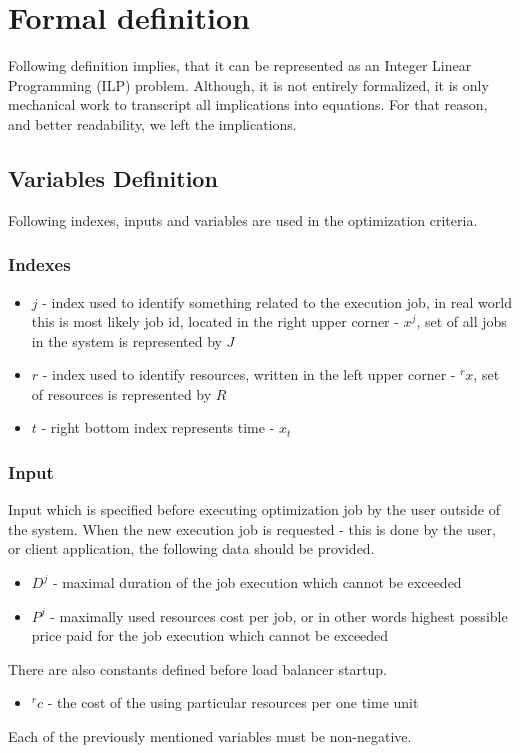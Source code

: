 \section{Formal definition}\label{sec:formal-definition}
Following definition implies, that it can be represented as an Integer Linear Programming (ILP) problem.
Although, it is not entirely formalized, 
it is only mechanical work to transcript all implications into equations.
For that reason, and better readability, we left the implications.

\subsection{Variables Definition}\label{subsec:variables-definition}
Following indexes, inputs and variables are used in the optimization criteria.

\subsubsection{Indexes}
\begin{itemize}
    \item $j$ - index used to identify something related to the execution job,
          in real world this is most likely job id, located in the right upper corner - $x^{j}$, 
          set of all jobs in the system is represented by $J$
    \item $r$ - index used to identify resources, written in the left upper corner - ${}^{r}x$, set of resources is represented by $R$
    \item $t$ - right bottom index represents time - $x_t$
\end{itemize}

\subsubsection{Input}\label{subsubsec:formal-input}
Input which is specified before executing optimization job by the user outside of the system.
When the new execution job is requested - this is done by the user, or client application,
the following data should be provided.
\begin{itemize}
    \item $D^{j}$ - maximal duration of the job execution which cannot be exceeded
    \item $P^{j}$ - maximally used resources cost per job, or in other words highest possible price paid for the job execution which cannot be exceeded
\end{itemize} 
There are also constants defined before load balancer startup.
\begin{itemize}
    \item ${}^{r}c$ - the cost of the using particular resources per one time unit
\end{itemize}
Each of the previously mentioned variables must be non-negative.


